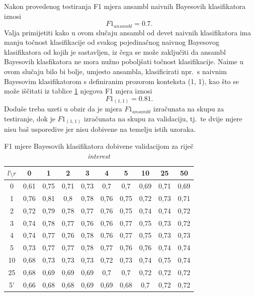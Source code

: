 \documentclass[10pt, a4paper]{article}
\begin{document}
Nakon provedenog testiranja F1 mjera ansambl naivnih Bayesovih klasifikatora
iznosi
\begin{equation}
\label{eq:F1_ansambl}
F1_{ansambl} = 0.7.
\end{equation}
Valja primijetiti kako u ovom
slučaju ansambl od devet naivnih klasifikatora ima manju točnost klasifikacije
od svakog pojedinačnog naivnog Bayesovog klasifikatora od kojih je sastavljen,
iz čega se može zaključiti da ansambl Bayesovih klasfikatora ne mora nužno poboljšati
točnost klasifikacije. Naime u ovom slučaju bilo bi bolje, umjesto ansambla, klasificirati
npr.~s naivnim Bayesovim klasifikatorom s definiranim prozorom konteksta (1, 1), kao
što se može iščitati iz tablice \ref{tab:interest_validation_bayes} njegova F1 mjera iznosi
\begin{equation}
\label{eq:F1_1_1}
F1_{(1,1)} = 0.81.
\end{equation}
Doduše treba uzeti u obzir da je mjera $F1_{ansambl}$ izračunata na skupu za testiranje,
dok je $F1_{(1,1)}$ izračunata na skupu za validaciju, tj.~te dvije mjere nisu
baš usporedive jer nisu dobivene na temelju istih uzoraka.

\begin{table}[!hbtp]
\caption{F1 mjere Bayesovih klasifikatora dobivene validacijom za riječ \emph{interest}}
\label{tab:interest_validation_bayes}
\begin{center}
\begin{tabular}{|c|ccccccccc|}
\hline
$l \setminus r$ & 0 & 1 & 2 & 3 & 4 & 5 & 10 & 25 & 50 \\
\hline
0  & 0,61 & 0,75 & 0,71 & 0,73 & 0,7  & 0,7  & 0,69 & 0,71 & 0,69  \\
1  & 0,76 & 0,81 & 0,8  & 0,78 & 0,76 & 0,75 & 0,72 & 0,73 & 0,71  \\
2  & 0,72 & 0,79 & 0,78 & 0,77 & 0,76 & 0,75 & 0,74 & 0,74 & 0,72  \\
3  & 0,74 & 0,78 & 0,77 & 0,76 & 0,76 & 0,77 & 0,75 & 0,73 & 0,72  \\
4  & 0,74 & 0,77 & 0,76 & 0,78 & 0,76 & 0,77 & 0,75 & 0,73 & 0,73  \\
5  & 0,73 & 0,77 & 0,77 & 0,78 & 0,77 & 0,76 & 0,76 & 0,74 & 0,74  \\
10 & 0,68 & 0,73 & 0,73 & 0,73 & 0,72 & 0,73 & 0,74 & 0,75 & 0,74  \\
25 & 0,68 & 0,69 & 0,69 & 0,69 & 0,7  & 0,7  & 0,72 & 0,72 & 0,72  \\
5' & 0,66 & 0,68 & 0,68 & 0,69 & 0,69 & 0,68 & 0,7  & 0,72 & 0,72  \\
\hline
\end{tabular}
\end{center}
\end{table}
\end{document}
